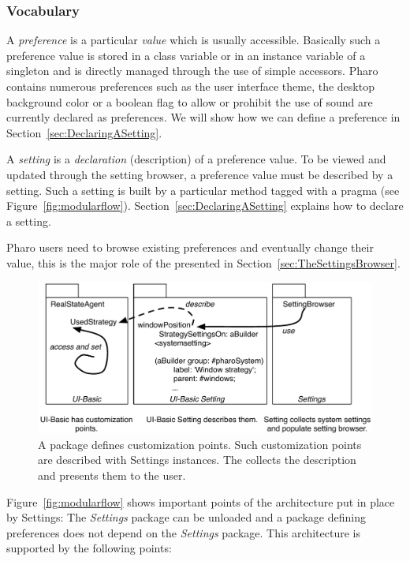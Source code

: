 \documentclass[a4paper,10pt,twoside]{book}
\begin{document}
\subsubsection{Vocabulary}
A \emph{preference} is a particular \emph{value} which is usually accessible. Basically such a preference value is stored in a class variable or in an instance variable of a singleton and is directly managed through the use of simple accessors. Pharo contains numerous preferences such as the user interface theme, the desktop background color or a boolean flag to allow or prohibit the use of sound are currently declared as preferences. We will show how we can define a preference in Section~\ref{sec:DeclaringASetting}. 

A \emph{setting} is a \emph{declaration} (description) of a preference value. To be viewed and updated through the setting browser, a preference value must be described by a setting. Such a setting is built by a particular method tagged with a pragma (see Figure~\ref{fig:modularflow}). Section~\ref{sec:DeclaringASetting} explains how to declare a setting.

Pharo users need to browse existing preferences and eventually change their value, this is the major role of the \setbrowser presented in Section~\ref{sec:TheSettingsBrowser}.


\begin{figure}[tbh]
\begin{center}
\includegraphics[scale=0.5]{modularflow}
\caption{A package defines customization points. Such customization points are described with Settings instances. The \setbrowser collects the description and presents them to the user.}
\end{center}
\end{figure}

Figure~\ref{fig:modularflow} shows important points of the architecture put in place by Settings: The \emph{Settings} package can be unloaded and a package defining preferences does not depend on the \emph{Settings} package. This architecture is supported by the following points:
\end{document}
